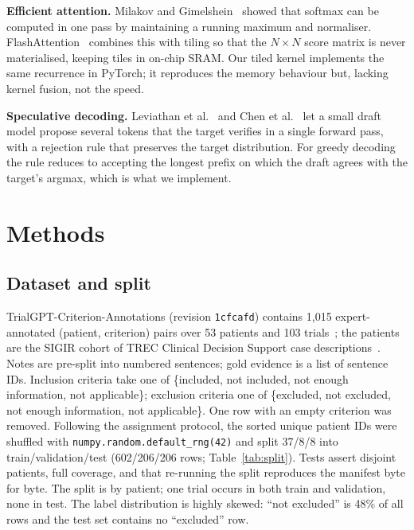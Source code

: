 \documentclass[conference]{IEEEtran}
\begin{document}
\textbf{Efficient attention.} Milakov and Gimelshein~\cite{milakov2018online} showed that softmax can be computed in one pass by maintaining a running maximum and normaliser. FlashAttention~\cite{dao2022flashattention} combines this with tiling so that the $N\times N$ score matrix is never materialised, keeping tiles in on-chip SRAM. Our tiled kernel implements the same recurrence in PyTorch; it reproduces the memory behaviour but, lacking kernel fusion, not the speed.

\textbf{Speculative decoding.} Leviathan et al.~\cite{leviathan2023fast} and Chen et al.~\cite{chen2023accelerating} let a small draft model propose several tokens that the target verifies in a single forward pass, with a rejection rule that preserves the target distribution. For greedy decoding the rule reduces to accepting the longest prefix on which the draft agrees with the target's argmax, which is what we implement.

\section{Methods}
\subsection{Dataset and split}
TrialGPT-Criterion-Annotations (revision \texttt{1cfcafd}) contains 1{,}015 expert-annotated (patient, criterion) pairs over 53 patients and 103 trials~\cite{jin2024trialgpt}; the patients are the SIGIR cohort of TREC Clinical Decision Support case descriptions~\cite{koopman2016test}. Notes are pre-split into numbered sentences; gold evidence is a list of sentence IDs. Inclusion criteria take one of \{included, not included, not enough information, not applicable\}; exclusion criteria one of \{excluded, not excluded, not enough information, not applicable\}. One row with an empty criterion was removed. Following the assignment protocol, the sorted unique patient IDs were shuffled with \texttt{numpy.random.default\_rng(42)} and split 37/8/8 into train/validation/test (602/206/206 rows; Table~\ref{tab:split}). Tests assert disjoint patients, full coverage, and that re-running the split reproduces the manifest byte for byte. The split is by patient; one trial occurs in both train and validation, none in test. The label distribution is highly skewed: ``not excluded'' is 48\% of all rows and the test set contains no ``excluded'' row.
\end{document}
